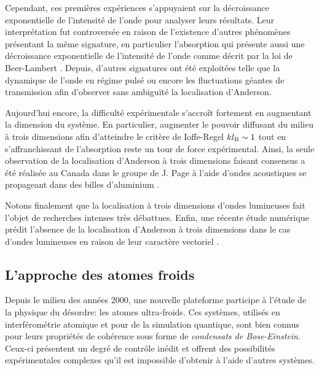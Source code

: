 Cependant, ces premières expériences s'appuyaient sur la décroissance exponentielle de l'intensité de l'onde pour analyser leurs résultats. Leur interprétation fut controversée en raison de l'existence d'autres phénomènes présentant la même signature, en particulier l'absorption qui présente aussi une décroissance exponentielle de l'intensité de l'onde comme décrit par la loi de Beer-Lambert \citep{scheffold1999localization}. Depuis, d'autres signatures ont été exploitées telle que la dynamique de l'onde en régime pulsé \citep{weaver1993anomalous} ou encore les fluctuations géantes de transmission \citep{nieuwenhuizen1995intensity} afin d'observer sans ambiguïté la localisation d'Anderson.

Aujourd'hui encore, la difficulté expérimentale s'accroît fortement en augmentant la dimension du système. En particulier, augmenter le pouvoir diffusant du milieu à trois dimensions afin d'atteindre le critère de Ioffe-Regel $k l_{\mathrm{B}} \sim 1$ tout en s'affranchissant de l'absorption reste un tour de force expérimental. Ainsi, la seule observation de la localisation d'Anderson à trois dimensions faisant consensus a été réalisée au Canada dans le groupe de J. Page à l'aide d'ondes acoustiques se propageant dans des billes d'aluminium \citep{hu2008localization}.

Notons finalement que la localisation à trois dimensions d'ondes lumineuses fait l'objet de recherches intenses très débattues. Enfin, une récente étude numérique prédit l'absence de la localisation d'Anderson à trois dimensions dans le cas d'ondes lumineuses en raison de leur caractère vectoriel \citep{skipetrov2014absence}.












\subsection{L'approche des atomes froids}
\label{sc:localisation_atomes_froids}
Depuis le milieu des années 2000, une nouvelle plateforme participe à l'étude de la physique du désordre: les atomes ultra-froids. Ces systèmes, utilisés en interférométrie atomique et pour de la simulation quantique, sont bien connus pour leurs propriétés de cohérence sous forme de \emph{condensats de Bose-Einstein}. Ceux-ci présentent un degré de contrôle inédit et offrent des possibilités expérimentales complexes qu'il est impossible d'obtenir à l'aide d'autres systèmes.


